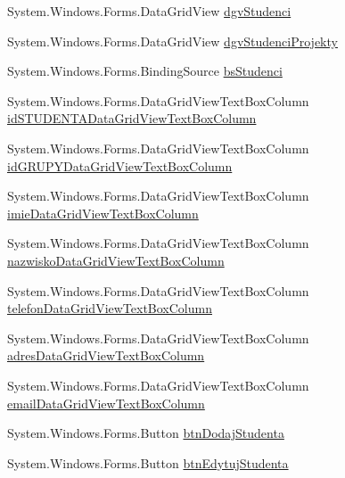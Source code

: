 \begin{DoxyCompactItemize}
\item 
System.\+Windows.\+Forms.\+Data\+Grid\+View \hyperlink{class_dziennik_ocen_1_1_form_prowadzacy_a280134b3087c1db583b6d8accdb11d73}{dgv\+Studenci}
\item 
System.\+Windows.\+Forms.\+Data\+Grid\+View \hyperlink{class_dziennik_ocen_1_1_form_prowadzacy_a20ff62aa8f7c123b9276bd6e133ff714}{dgv\+Studenci\+Projekty}
\item 
System.\+Windows.\+Forms.\+Binding\+Source \hyperlink{class_dziennik_ocen_1_1_form_prowadzacy_acb3d54ff7aa50085f771db31c0f485e0}{bs\+Studenci}
\item 
System.\+Windows.\+Forms.\+Data\+Grid\+View\+Text\+Box\+Column \hyperlink{class_dziennik_ocen_1_1_form_prowadzacy_a33dec2a21fdb11d452047f1afc2d8a96}{id\+S\+T\+U\+D\+E\+N\+T\+A\+Data\+Grid\+View\+Text\+Box\+Column}
\item 
System.\+Windows.\+Forms.\+Data\+Grid\+View\+Text\+Box\+Column \hyperlink{class_dziennik_ocen_1_1_form_prowadzacy_a15f429ca0f0961dd4571c63138da4a44}{id\+G\+R\+U\+P\+Y\+Data\+Grid\+View\+Text\+Box\+Column}
\item 
System.\+Windows.\+Forms.\+Data\+Grid\+View\+Text\+Box\+Column \hyperlink{class_dziennik_ocen_1_1_form_prowadzacy_a82220a781511306722d00a5bb8e34ba8}{imie\+Data\+Grid\+View\+Text\+Box\+Column}
\item 
System.\+Windows.\+Forms.\+Data\+Grid\+View\+Text\+Box\+Column \hyperlink{class_dziennik_ocen_1_1_form_prowadzacy_a55462891f1ebc82f3bd540a5ba7724d8}{nazwisko\+Data\+Grid\+View\+Text\+Box\+Column}
\item 
System.\+Windows.\+Forms.\+Data\+Grid\+View\+Text\+Box\+Column \hyperlink{class_dziennik_ocen_1_1_form_prowadzacy_a42c35ed0c3c7f4bf6d91cdcf8425ce5d}{telefon\+Data\+Grid\+View\+Text\+Box\+Column}
\item 
System.\+Windows.\+Forms.\+Data\+Grid\+View\+Text\+Box\+Column \hyperlink{class_dziennik_ocen_1_1_form_prowadzacy_a8f69f55632c9ef001cedd52d78e033e9}{adres\+Data\+Grid\+View\+Text\+Box\+Column}
\item 
System.\+Windows.\+Forms.\+Data\+Grid\+View\+Text\+Box\+Column \hyperlink{class_dziennik_ocen_1_1_form_prowadzacy_aac63cf038655c3c816becf4f3c877e21}{email\+Data\+Grid\+View\+Text\+Box\+Column}
\item 
System.\+Windows.\+Forms.\+Button \hyperlink{class_dziennik_ocen_1_1_form_prowadzacy_a2ba007452bcd972a9c6e27873e7ec9f2}{btn\+Dodaj\+Studenta}
\item 
System.\+Windows.\+Forms.\+Button \hyperlink{class_dziennik_ocen_1_1_form_prowadzacy_a9696c9b859ef8c8319cae4bbd11541bc}{btn\+Edytuj\+Studenta}

\end{DoxyCompactItemize}

